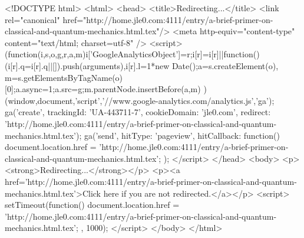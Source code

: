 <!DOCTYPE html>
<html>
<head>
<title>Redirecting...</title>
<link rel="canonical" href="http://home.jle0.com:4111/entry/a-brief-primer-on-classical-and-quantum-mechanics.html.tex"/>
<meta http-equiv="content-type" content="text/html; charset=utf-8" />
<script>
(function(i,s,o,g,r,a,m){i['GoogleAnalyticsObject']=r;i[r]=i[r]||function(){
(i[r].q=i[r].q||[]).push(arguments)},i[r].l=1*new Date();a=s.createElement(o),
m=s.getElementsByTagName(o)[0];a.async=1;a.src=g;m.parentNode.insertBefore(a,m)
})(window,document,'script','//www.google-analytics.com/analytics.js','ga');
ga('create', { trackingId: 'UA-443711-7', cookieDomain: 'jle0.com', redirect: 'http://home.jle0.com:4111/entry/a-brief-primer-on-classical-and-quantum-mechanics.html.tex'});
ga('send', { hitType: 'pageview', hitCallback: function() { document.location.href = 'http://home.jle0.com:4111/entry/a-brief-primer-on-classical-and-quantum-mechanics.html.tex'; } });
</script>
</head>
<body>
  <p><strong>Redirecting...</strong></p>
  <p><a href='http://home.jle0.com:4111/entry/a-brief-primer-on-classical-and-quantum-mechanics.html.tex'>Click here if you are not redirected.</a></p>
  <script>
    setTimeout(function() { document.location.href = 'http://home.jle0.com:4111/entry/a-brief-primer-on-classical-and-quantum-mechanics.html.tex'; }, 1000);
  </script>
</body>
</html>
